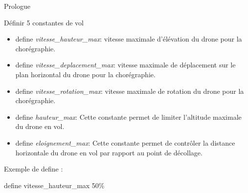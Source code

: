 \documentclass{bredelebeamer}
\begin{document}
\begin{frame}[fragile]{Prologue}
\begin{block}{Définir 5 constantes de vol}
\begin{itemize}
\item \alert{define} \emph{vitesse\_hauteur\_max}: vitesse maximale d'élévation du drone pour la chorégraphie.
\item \alert{define} \emph{vitesse\_deplacement\_max}: vitesse maximale de déplacement sur le plan horizontal du drone pour la chorégraphie. 
\item \alert{define} \emph{vitesse\_rotation\_max}: vitesse maximale de rotation du drone pour la chorégraphie.
\item \alert{define} \emph{hauteur\_max}: Cette constante permet de limiter l'altitude maximale du drone en vol.
\item \alert{define} \emph{eloignement\_max}: Cette constante permet de contr\^oler la distance horizontale du drone en vol par rapport au point de décollage.
\end{itemize}
\end{block}


Exemple de define : 
\begin{center}
\color{Framarouge}
	define vitesse\_hauteur\_max \color{Framagris}50\%
\end{center}
\end{frame} 
\end{document}
